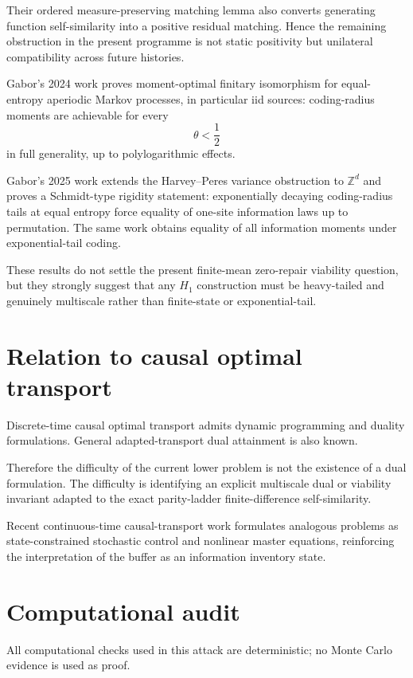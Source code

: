 \documentclass[11pt,a4paper]{article}
\newcommand{\Z}{\mathbb Z}
\begin{document}
Their ordered measure-preserving matching lemma also converts generating
function self-similarity into a positive residual matching.  Hence the
remaining obstruction in the present programme is not static positivity
but unilateral compatibility across future histories.

Gabor's 2024 work proves moment-optimal finitary isomorphism for
equal-entropy aperiodic Markov processes, in particular iid sources:
coding-radius moments are achievable for every
\[
\theta<\frac12
\]
in full generality, up to polylogarithmic effects.

Gabor's 2025 work extends the Harvey--Peres variance obstruction to
\(\Z^d\) and proves a Schmidt-type rigidity statement: exponentially
decaying coding-radius tails at equal entropy force equality of one-site
information laws up to permutation.  The same work obtains equality of all
information moments under exponential-tail coding.

These results do not settle the present finite-mean zero-repair viability
question, but they strongly suggest that any \(H_1\) construction must be
heavy-tailed and genuinely multiscale rather than finite-state or
exponential-tail.

\section{Relation to causal optimal transport}

Discrete-time causal optimal transport admits dynamic programming and
duality formulations.  General adapted-transport dual attainment is also
known.

Therefore the difficulty of the current lower problem is not the existence
of a dual formulation.  The difficulty is identifying an explicit
multiscale dual or viability invariant adapted to the exact parity-ladder
finite-difference self-similarity.

Recent continuous-time causal-transport work formulates analogous problems
as state-constrained stochastic control and nonlinear master equations,
reinforcing the interpretation of the buffer as an information inventory
state.

\section{Computational audit}

All computational checks used in this attack are deterministic; no Monte
Carlo evidence is used as proof.
\end{document}
